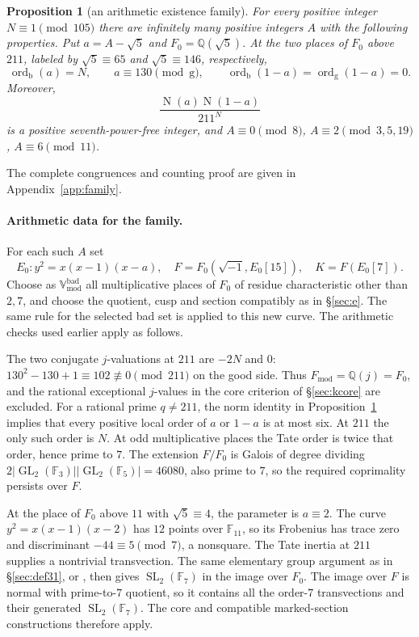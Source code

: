 \documentclass[11pt]{article}
\theoremstyle{plain}
\newtheorem{proposition}[theorem]{Proposition}
\theoremstyle{definition}
\newcommand{\Fmod}{F_{\mathrm{mod}}}
\newcommand{\Vbad}{\mathbb{V}^{\mathrm{bad}}}
\newcommand{\ord}{\operatorname{ord}}
\newcommand{\Norm}{\operatorname{N}}
\begin{document}
\begin{proposition}[an arithmetic existence family]\label{prop:exist}
For every positive integer $N\equiv1\pmod{105}$ there are infinitely many
positive integers $A$ with the following properties.  Put
$a=A-\sqrt5$ and $F_0=\mathbb Q(\sqrt5)$.
At the two places of $F_0$ above $211$, labeled by
$\sqrt5\equiv65$ and $\sqrt5\equiv146$, respectively,
\[
 \ord_{\mathrm b}(a)=N,\qquad
 a\equiv130\pmod{\mathrm g},\qquad
 \ord_{\mathrm b}(1-a)=\ord_{\mathrm g}(1-a)=0.
\]
Moreover,
\[
 \frac{\Norm(a)\Norm(1-a)}{211^N}
\]
is a positive seventh-power-free integer, and
$A\equiv0\pmod8$, $A\equiv2\pmod{3,5,19}$, $A\equiv6\pmod{11}$.
\end{proposition}
The complete congruences and counting proof are given in Appendix~\ref{app:family}.


\paragraph{Arithmetic data for the family.}
For each such $A$ set
\[
 E_0:y^2=x(x-1)(x-a),\quad
 F=F_0(\sqrt{-1},E_0[15]),\quad K=F(E_0[7]).
\]
Choose as $\Vbad_{\mathrm{mod}}$ all multiplicative places of $F_0$ of
residue characteristic other than $2,7$, and choose the quotient, cusp and
section compatibly as in \S\ref{sec:e}.
The same rule for the selected bad set is applied to this new curve.  The arithmetic checks used earlier apply as follows.

The two conjugate $j$-valuations at $211$ are $-2N$ and $0$:
$130^2-130+1\equiv102\not\equiv0\pmod{211}$ on the good side.
Thus $\Fmod=\mathbb Q(j)=F_0$, and the rational exceptional $j$-values in
the core criterion of \S\ref{sec:kcore} are excluded.
For a rational prime $q\ne211$, the norm identity in
Proposition~\ref{prop:exist} implies that every positive local order of
$a$ or $1-a$ is at most six.  At $211$ the only such order is $N$.
At odd multiplicative places the Tate order is twice that order, hence
prime to $7$.  The extension $F/F_0$ is Galois of degree dividing
$2|\operatorname{GL}_2(\mathbb F_3)||\operatorname{GL}_2(\mathbb F_5)|
=46080$, also prime to $7$, so the required coprimality persists over $F$.

At the place of $F_0$ above $11$ with $\sqrt5\equiv4$, the parameter is
$a\equiv2$.  The curve $y^2=x(x-1)(x-2)$ has $12$ points over $\mathbb F_{11}$,
so its Frobenius has trace zero and discriminant $-44\equiv5\pmod7$,
a nonsquare.  The Tate inertia at $211$ supplies a nontrivial transvection.
The same elementary group argument as in \S\ref{sec:def31}, or
\cite[Lemma 3.1(iii)]{GenEll}, then gives
$\operatorname{SL}_2(\mathbb F_7)$ in the image over $F_0$.
The image over $F$ is normal with prime-to-$7$ quotient, so it contains
all the order-$7$ transvections and their generated
$\operatorname{SL}_2(\mathbb F_7)$.
The core and compatible marked-section constructions therefore apply.
\end{document}
